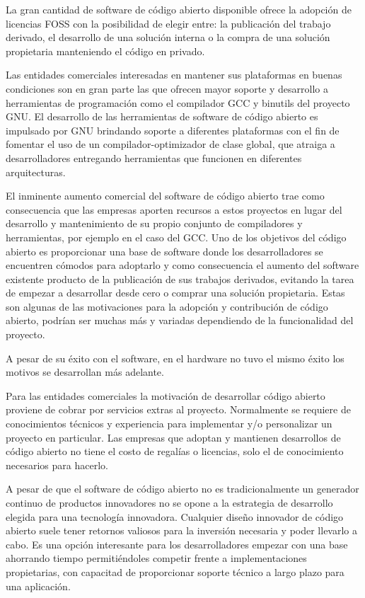 La gran cantidad de software de código abierto disponible ofrece la
adopción de licencias FOSS con la posibilidad de elegir entre: la
publicación del trabajo derivado, el desarrollo de una solución
interna o la compra de una solución propietaria manteniendo el código
en privado.

Las entidades comerciales interesadas en mantener sus plataformas en
buenas condiciones son en gran parte las que ofrecen mayor soporte y
desarrollo a herramientas de programación como el compilador GCC y
binutils del proyecto GNU. El desarrollo de las herramientas de
software de código abierto es impulsado por GNU brindando soporte a
diferentes plataformas con el fin de fomentar el uso de un
compilador-optimizador de clase global, que atraiga a desarrolladores
entregando herramientas que funcionen en diferentes arquitecturas.

El inminente aumento comercial del software de código abierto trae
como consecuencia que las empresas aporten recursos a estos proyectos
en lugar del desarrollo y mantenimiento de su propio conjunto de
compiladores y herramientas, por ejemplo en el caso del GCC. Uno de
los objetivos del código abierto es proporcionar una base de software
donde los desarrolladores se encuentren cómodos para adoptarlo y como
consecuencia el aumento del software existente producto de la
publicación de sus trabajos derivados, evitando la tarea de empezar a
desarrollar desde cero o comprar una solución propietaria. Estas son
algunas de las motivaciones para la adopción y contribución de código
abierto, podrían ser muchas más y variadas dependiendo de la
funcionalidad del proyecto. 

A pesar de su éxito con el software, en el hardware no tuvo el mismo
éxito los motivos se desarrollan más adelante.

Para las entidades comerciales la motivación de desarrollar código
abierto proviene de cobrar por servicios extras al
proyecto. Normalmente se requiere de conocimientos técnicos y
experiencia para implementar y/o personalizar un proyecto en
particular. Las empresas que adoptan y mantienen desarrollos de código
abierto no tiene el costo de regalías o licencias, solo el de
conocimiento necesarios para hacerlo.

A pesar de que el software de código abierto no es tradicionalmente un
generador continuo de productos innovadores no se opone a la
estrategia de desarrollo elegida para una tecnología
innovadora. Cualquier diseño innovador de código abierto suele tener
retornos valiosos para la inversión necesaria y poder llevarlo a
cabo. Es una opción interesante para los desarrolladores empezar con
una base ahorrando tiempo permitiéndoles competir frente a
implementaciones propietarias, con capacitad de proporcionar soporte
técnico a largo plazo para una aplicación.

